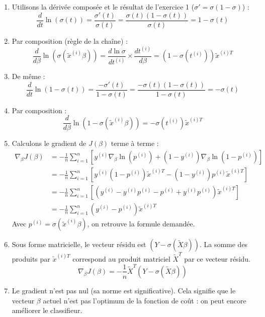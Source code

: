 \documentclass[solutions]{../exercices}
\begin{document}
\begin{solution}
\begin{enumerate}
        \item Utilisons la dérivée composée et le résultat de l'exercice 1 ($\sigma' = \sigma(1-\sigma)$) :
        \[
            \frac{d}{d t} \ln(\sigma(t)) = \frac{\sigma'(t)}{\sigma(t)} = \frac{\sigma(t)(1-\sigma(t))}{\sigma(t)} = 1 - \sigma(t)
        \]

        \item Par composition (règle de la chaîne) :
        \[
            \frac{d}{d \beta} \ln(\sigma(\tilde{x}^{(i)} \beta)) = \frac{d \ln \sigma}{d t^{(i)}} \times \frac{d t^{(i)}}{d \beta} = (1 - \sigma(t^{(i)})) \tilde{x}^{(i)T}
        \]

        \item De même :
        \[
            \frac{d}{d t} \ln(1-\sigma(t)) = \frac{-\sigma'(t)}{1-\sigma(t)} = \frac{-\sigma(t)(1-\sigma(t))}{1-\sigma(t)} = -\sigma(t)
        \]

        \item Par composition :
        \[
            \frac{d}{d \beta} \ln(1-\sigma(\tilde{x}^{(i)} \beta)) = -\sigma(t^{(i)}) \tilde{x}^{(i)T}
        \]

        \item Calculons le gradient de $J(\beta)$ terme à terme :
        \begin{align*}
            \nabla_\beta J(\beta) &= - \frac{1}{n} \sum_{i=1}^n \left[ y^{(i)} \nabla_\beta \ln(p^{(i)}) + (1 - y^{(i)}) \nabla_\beta \ln(1 - p^{(i)}) \right] \\
            &= - \frac{1}{n} \sum_{i=1}^n \left[ y^{(i)} (1 - p^{(i)})\tilde{x}^{(i)T} - (1 - y^{(i)}) p^{(i)}\tilde{x}^{(i)T} \right] \\
            &= - \frac{1}{n} \sum_{i=1}^n \left[ (y^{(i)} - y^{(i)}p^{(i)} - p^{(i)} + y^{(i)}p^{(i)}) \tilde{x}^{(i)T} \right] \\
            &= - \frac{1}{n} \sum_{i=1}^n \left( y^{(i)} - p^{(i)} \right) \tilde{x}^{(i)T}
        \end{align*}
        Avec $p^{(i)} = \sigma(\tilde{x}^{(i)} \beta)$, on retrouve la formule demandée.

        \item Sous forme matricielle, le vecteur résidu est $(Y - \sigma(\tilde{X}\beta))$. La somme des produits par $\tilde{x}^{(i)T}$ correspond au produit matriciel $\tilde{X}^T$ par ce vecteur résidu.
        \[ \nabla_\beta J(\beta) = -\frac{1}{n} \tilde{X}^T \left( Y - \sigma(\tilde{X} \beta)\right) \]

        \item Le gradient n'est pas nul (sa norme est significative). Cela signifie que le vecteur $\beta$ actuel n'est pas l'optimum de la fonction de coût : on peut encore améliorer le classifieur.


\end{enumerate}
\end{solution}
\end{document}
